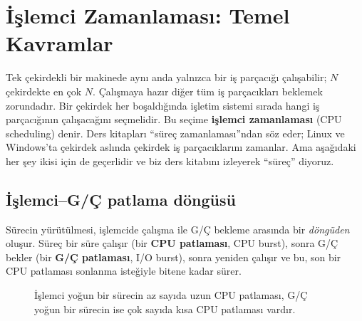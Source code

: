 \documentclass[11pt,a4paper]{article}
\newcommand{\term}[1]{\textbf{\color{mintdeep}#1}}
\begin{document}
\section{İşlemci Zamanlaması: Temel Kavramlar}

Tek çekirdekli bir makinede aynı anda yalnızca bir iş parçacığı çalışabilir; $N$ çekirdekte en çok $N$. Çalışmaya hazır diğer tüm iş parçacıkları beklemek zorundadır. Bir çekirdek her boşaldığında işletim sistemi sırada hangi iş parçacığının çalışacağını seçmelidir. Bu seçime \term{işlemci zamanlaması} (CPU scheduling) denir. Ders kitapları ``süreç zamanlaması''ndan söz eder; Linux ve Windows'ta çekirdek aslında çekirdek iş parçacıklarını zamanlar. Ama aşağıdaki her şey ikisi için de geçerlidir ve biz ders kitabını izleyerek ``süreç'' diyoruz.

\subsection{İşlemci--G/Ç patlama döngüsü}

Sürecin yürütülmesi, işlemcide çalışma ile G/Ç bekleme arasında bir \emph{döngüden} oluşur. Süreç bir süre çalışır (bir \term{CPU patlaması}, CPU burst), sonra G/Ç bekler (bir \term{G/Ç patlaması}, I/O burst), sonra yeniden çalışır ve bu, son bir CPU patlaması sonlanma isteğiyle bitene kadar sürer.

\begin{figure}[H]
\centering
{}
\caption{İşlemci yoğun bir sürecin az sayıda uzun CPU patlaması, G/Ç yoğun bir sürecin ise çok sayıda kısa CPU patlaması vardır.}
\end{figure}
\end{document}

